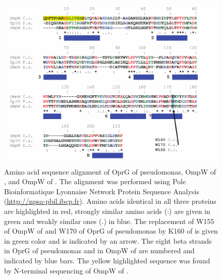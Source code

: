 \begin{figure}[htb]
  	\begin{center}
   		\includegraphics[]{porin_chapter/img/Fig5-seqalign.pdf}
   	\end{center}
   	\caption[Amino acid sequence alignment of OprG of \ac{pseudomonas}, OmpW of \ecoli, and OmpW of \caulobacter]{Amino acid sequence alignment of OprG of \ac{pseudomonas}, OmpW of \ecoli, and OmpW of \caulobacter.
The alignment was performed using Pole Bioinformatique Lyonnaise Network Protein Sequence Analysis (\url{http://npsa-pbil.ibcp.fr}). Amino acids identical in all three proteins are highlighted in red, strongly similar amino acids (:) are given in green and weakly similar ones (.) in blue. The replacement of W155 of OmpW of \ecoli and W170 of OprG of \ac{pseudomonas} by K160 of \caulobacter is given in green color and is indicated by an arrow. The eight beta strands in OprG of \ac{pseudomonas} and in OmpW of \ecoli are numbered and indicated by blue bars. The yellow highlighted sequence was found by N-terminal sequencing of OmpW of \caulobacter.
   	}
   	\label{fig:porin-seqalign}
\end{figure}   

